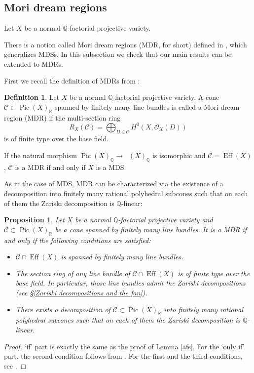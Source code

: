 \documentclass[12pt,twoside]{amsart}
\newtheorem{prop}[theo]{Proposition}
\theoremstyle{definition}
\newtheorem{defi}[theo]{Definition}
\newcommand\Pic{\mathop{\mathrm{Pic}}\nolimits}
\newcommand\Num{\mathop{\mathrm{N}^{1}}\nolimits}
\newcommand\Eff{\mathop{\mathrm{Eff}}\nolimits}
\newcommand\bq{\mathbb{Q}}
\newcommand\br{\mathbb{R}}
\newcommand\OO{\mathcal{O}}
\begin{document}
\subsection{Mori dream regions}\label{Mori dream regions}

Let $X$ be a normal $\bq$-factorial projective variety.


There is a notion called Mori dream regions (MDR, for short) defined in \cite[Definition 2.12]{hk},
which generalizes MDSs. In this subsection we check that our main results can be extended to
MDRs.

First we recall the definition of MDRs from \cite[Definition 2.12]{hk}:
\begin{defi}\label{MDR}
Let $X$ be a normal $\bq$-factorial projective variety. A cone $\mathcal{C}\subset\Pic{(X)}_{\br}$
spanned by finitely many line bundles is called a Mori dream region (MDR) if
the multi-section ring
\begin{equation*}
R_{X}(\mathcal{C})=\bigoplus_{D\in\mathcal{C}}H^{0}(X,\OO_{X}(D))
\end{equation*}
is of finite type over the base field.
\end{defi}

If the natural morphism $\Pic{(X)}_{\bq}\to\Num{(X)}_{\bq}$ is isomorphic and $\mathcal{C}=\Eff{(X)}$, $\mathcal{C}$ is
a MDR if and only if $X$ is a MDS.


As in the case of MDS, MDR can be characterized via the existence of a decomposition into
finitely many rational polyhedral subcones such that on each of them the Zariski decomposition is
$\bq$-linear:

\begin{prop}\label{MDR and ZD}
Let $X$ be a normal $\bq$-factorial projective variety and $\mathcal{C}\subset\Pic{(X)}_{\br}$ be a cone
spanned by finitely many line bundles. It is a MDR if and only if the following conditions are satisfied:
\begin{itemize}
\item $\mathcal{C}\cap\Eff{(X)}$ is spanned by finitely many line bundles.
\item The section ring of any line bundle of $\mathcal{C}\cap\Eff{(X)}$ is of finite type over the base field.
In particular, those line bundles admit the Zariski decompositions
(see \S\ref{Zariski decompositions and the fan}).
\item There exists a decomposition of $\mathcal{C}\subset\Pic{(X)}_{\br}$ into finitely many
rational polyhedral subcones such that on each of them the Zariski decomposition is $\bq$-linear.
\end{itemize}
\end{prop}
\begin{proof}
`if' part is exactly the same as the proof of Lemma \ref{afs}.
For the `only if' part, the second condition follows from \cite[`If' part of Lemma 1.6]{hk}. For the first and
the third conditions, see \cite[Theorem 3.5]{cl}.
\end{proof}
\end{document}
